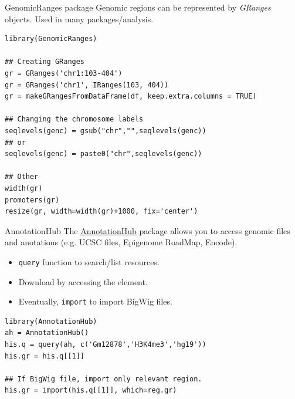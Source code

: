 \documentclass[10pt]{beamer}
\begin{document}

\begin{frame}[fragile]{GenomicRanges package}
  Genomic regions can be represented by {\it GRanges} objects. Used in many packages/analysis.
  \begin{block}{}
  \begin{lstlisting}
library(GenomicRanges)

## Creating GRanges
gr = GRanges('chr1:103-404')
gr = GRanges('chr1', IRanges(103, 404))
gr = makeGRangesFromDataFrame(df, keep.extra.columns = TRUE)

## Changing the chromosome labels
seqlevels(genc) = gsub("chr","",seqlevels(genc))
## or
seqlevels(genc) = paste0("chr",seqlevels(genc))

## Other
width(gr)
promoters(gr)
resize(gr, width=width(gr)+1000, fix='center')
  \end{lstlisting}
  \end{block}
\end{frame}

\begin{frame}[fragile]{AnnotationHub}
  The \href{http://bioconductor.org/packages/release/bioc/html/AnnotationHub.html}{AnnotationHub} package allows you to access genomic files and anotations (e.g. UCSC files, Epigenome RoadMap, Encode).
  \bigskip
  
  \begin{itemize}
  \item \verb!query! function to search/list resources.
  \item Download by accessing the element.
  \item Eventually, \verb!import! to import BigWig files.
  \end{itemize}
  \begin{block}{}
  \begin{lstlisting}
library(AnnotationHub)
ah = AnnotationHub()
his.q = query(ah, c('Gm12878','H3K4me3','hg19'))
his.gr = his.q[[1]]

## If BigWig file, import only relevant region.
his.gr = import(his.q[[1]], which=reg.gr)
  \end{lstlisting}
  \end{block}  
\end{frame}
\end{document}
